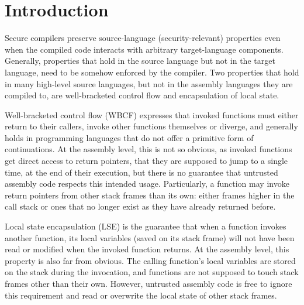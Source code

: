 \documentclass[acmsmall,review,anonymous]{acmart}\settopmatter{printfolios=true,printccs=false,printacmref=false}
\begin{document}




\maketitle


\section{Introduction}
Secure compilers preserve source-language (security-relevant) properties even when the compiled code interacts with arbitrary target-language components.
Generally, properties that hold in the source language but not in the target language, need to be somehow enforced by the compiler.
Two properties that hold in many high-level source languages, but not in the assembly languages they are compiled to, are well-bracketed control flow and encapsulation of local state.

Well-bracketed control flow (WBCF) expresses that invoked functions must either return to their callers, invoke other functions themselves or diverge, and generally holds in programming languages that do not offer a primitive form of continuations. 
At the assembly level, this is not so obvious, as invoked functions get direct access to return pointers, that they are supposed to jump to a single time, at the end of their execution, but there is no guarantee that untrusted assembly code respects this intended usage.
Particularly, a function may invoke return pointers from other stack frames than its own: either frames higher in the call stack or ones that no longer exist as they have already returned before. 

Local state encapsulation (LSE) is the guarantee that when a function invokes another function, its local variables (saved on its stack frame) will not have been read or modified when the invoked function returns.
At the assembly level, this property is also far from obvious.
The calling function's local variables are stored on the stack during the invocation, and functions are not supposed to touch stack frames other than their own.
However, untrusted assembly code is free to ignore this requirement and read or overwrite the local state of other stack frames.
\end{document}
